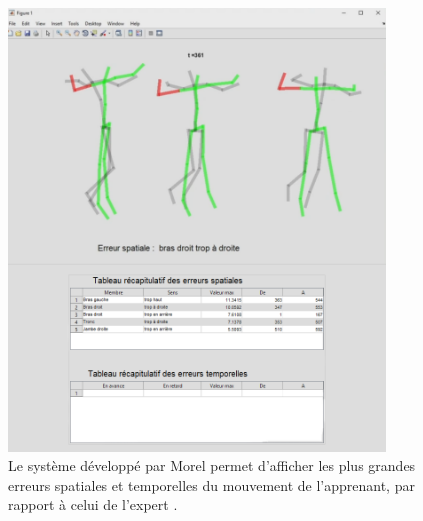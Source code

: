 \begin{figure}[h]
    \centering
    \includegraphics[width=10cm]{pictures/Morel_eiah.png}
    \caption[EIAH pour l'évaluation de gestes sportifs \parencite{Morel2017Mts}]{Le système développé par Morel permet d'afficher les plus grandes erreurs spatiales et temporelles du mouvement de l'apprenant, par rapport à celui de l'expert \parencite{Morel2017Mts}.}
    \label{fig:Morel_eiah}
\end{figure}

